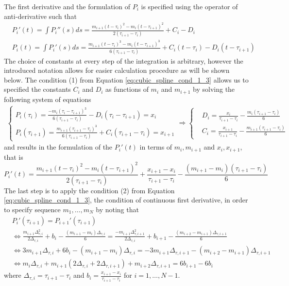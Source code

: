 \documentclass[article,moreauthors,pdftex,10pt,a4paper]{ssrn}
\begin{document}
The first derivative and the formulation of $P_i$ is specified using the operator of anti-derivative such that
\begin{align*}
& P_i'(t)  = \int P_i''(s) ds =  \frac{m_{i+1} (t - \tau_i)^2 - m_i (t - \tau_{i+1})^2}{2(\tau_{i+1} - \tau_i)} + C_i -D_i \\
& P_i(t)  = \int P_i'(s) ds =  \frac{m_{i+1} (t - \tau_i)^3 - m_i (t - \tau_{i+1})^3}{6(\tau_{i+1} - \tau_i)} + C_i(t - \tau_{i}) -D_i (t - \tau_{i+1})
\end{align*}
The choice of constants at every step of the integration is arbitrary, however the introduced notation allows for easier calculation procedure as will be shown below. The condition (1) from Equation \eqref{eq:cubic_spline_cond_1_3} allows us to specified the constants $C_i$ and $D_i$ as functions of $m_i$ and $m_{i+1}$ by solving the following system of equations
\begin{align*}
\begin{cases}
P_i(\tau_i) =  \frac{ - m_i (\tau_i - \tau_{i+1})^3}{6(\tau_{i+1} - \tau_i)}  -D_i (\tau_i- \tau_{i+1}) = x_i \\
P_i(\tau_{i+1}) =   \frac{m_{i+1} (\tau_{i+1} - \tau_i)^3 }{6(\tau_{i+1} - \tau_i)} + C_i(\tau_{i+1} - \tau_{i})  = x_{i+1} 
\end{cases} \Rightarrow 
\begin{cases}
& D_i = \frac{x_i}{\tau_{i+1} - \tau_i} - \frac{m_i (\tau_{i+1} - \tau_i)}{6} \\
& C_i = \frac{x_{i+1}}{\tau_{i+1} - \tau_i} - \frac{m_{i+1} (\tau_{i+1} - \tau_i)}{6}
\end{cases}
\end{align*}
and results in the formulation of the $P_i'(t)$ in terms of $m_i,m_{i+1}$ and $x_i,x_{i+1}$, that is
\begin{equation*}
P_i'(t) =  \frac{m_{i+1} (t - \tau_i)^2 - m_i (t - \tau_{i+1})^2}{2(\tau_{i+1} - \tau_i)} +  \frac{x_{i+1}- x_i}{\tau_{i+1} - \tau_i} - \frac{(m_{i+1} - m_i) (\tau_{i+1} - \tau_i)}{6}
\end{equation*}
The last step is to apply the condition (2) from Equation \ref{eq:cubic_spline_cond_1_3}, the condition of continuous first derivative, in order to specify sequence $m_1, \ldots, m_N$ by noting that
\begin{align*}
& P_i'(\tau_{i+1}) = P_{i+1}'(\tau_{i+1})   \\
&\Leftrightarrow  \frac{m_{i+1} \Delta_{\tau,i}^2}{2\Delta_{\tau,i}} +  b_i - \frac{(m_{i+1} - m_i) \Delta_{\tau,i}}{6} =  \frac{ - m_{i+1} \Delta_{\tau,i+1}^2}{2\Delta_{\tau,i}} +  b_{i+1} - \frac{(m_{i+2} - m_{i+1}) \Delta_{\tau,i+1}}{6} \\
&\Leftrightarrow 3 m_{i+1} \Delta_{\tau,i} + 6 b_i - (m_{i+1} - m_i) \Delta_{\tau,i} =   - 3 m_{i+1} \Delta_{\tau,i+1}  - (m_{i+2} - m_{i+1}) \Delta_{\tau,i+1} \\
&\Leftrightarrow m_i \Delta_{\tau,i} +  m_{i+1} (2\Delta_{\tau,i}+ 2\Delta_{\tau,i+1} )  + m_{i+2}\Delta_{\tau,i+1} =  6 b_{i+1} -  6 b_{i} 
\end{align*}
where $\Delta_{\tau,i} = \tau_{i+1} - \tau_i$ and $b_i =  \frac{x_{i+1}- x_i}{\tau_{i+1} - \tau_i}$ for $i = 1, \ldots, N-1$. 
\end{document}
